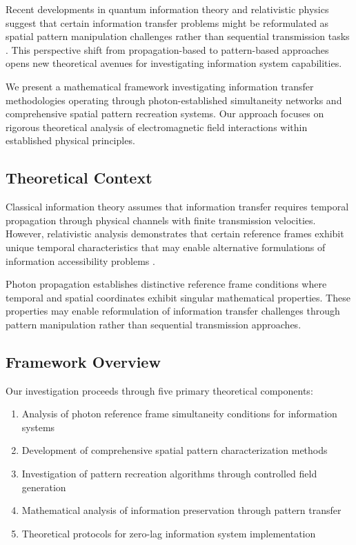 \documentclass[12pt,a4paper]{article}
\begin{document}
Recent developments in quantum information theory and relativistic physics suggest that certain information transfer problems might be reformulated as spatial pattern manipulation challenges rather than sequential transmission tasks \cite{nielsen2010quantum, preskill1998quantum}. This perspective shift from propagation-based to pattern-based approaches opens new theoretical avenues for investigating information system capabilities.

We present a mathematical framework investigating information transfer methodologies operating through photon-established simultaneity networks and comprehensive spatial pattern recreation systems. Our approach focuses on rigorous theoretical analysis of electromagnetic field interactions within established physical principles.

\subsection{Theoretical Context}

Classical information theory assumes that information transfer requires temporal propagation through physical channels with finite transmission velocities. However, relativistic analysis demonstrates that certain reference frames exhibit unique temporal characteristics that may enable alternative formulations of information accessibility problems \cite{rindler2001introduction}.

Photon propagation establishes distinctive reference frame conditions where temporal and spatial coordinates exhibit singular mathematical properties. These properties may enable reformulation of information transfer challenges through pattern manipulation rather than sequential transmission approaches.

\subsection{Framework Overview}

Our investigation proceeds through five primary theoretical components:

\begin{enumerate}
\item Analysis of photon reference frame simultaneity conditions for information systems
\item Development of comprehensive spatial pattern characterization methods
\item Investigation of pattern recreation algorithms through controlled field generation
\item Mathematical analysis of information preservation through pattern transfer
\item Theoretical protocols for zero-lag information system implementation
\end{enumerate}
\end{document}
